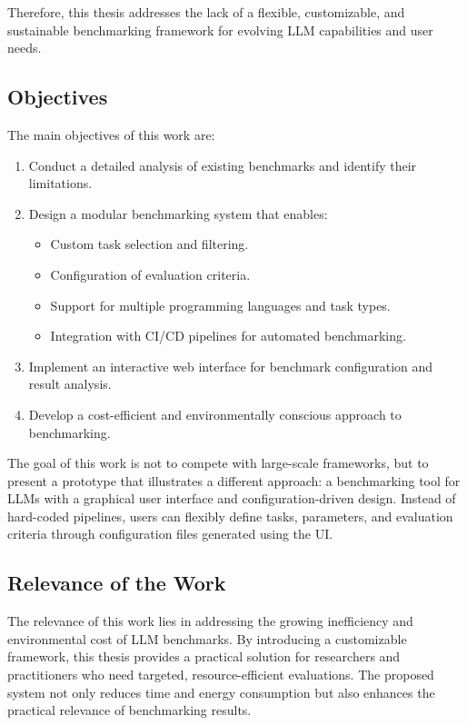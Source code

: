 Therefore, this thesis addresses the lack of a flexible, customizable, and sustainable benchmarking framework for evolving LLM capabilities and user needs.

\subsection{Objectives}

The main objectives of this work are:
\begin{enumerate}
    \item Conduct a detailed analysis of existing benchmarks and identify their limitations.
    \item Design a modular benchmarking system that enables:
    \begin{itemize}
        \item Custom task selection and filtering.
        \item Configuration of evaluation criteria.
        \item Support for multiple programming languages and task types.
        \item Integration with CI/CD pipelines for automated benchmarking.
    \end{itemize}
    \item Implement an interactive web interface for benchmark configuration and result analysis.
    \item Develop a cost-efficient and environmentally conscious approach to benchmarking.
\end{enumerate}

The goal of this work is not to compete with large-scale frameworks, but to present a prototype that illustrates a different approach: a benchmarking tool for LLMs with a graphical user interface and configuration-driven design.
Instead of hard-coded pipelines, users can flexibly define tasks, parameters, and evaluation criteria through configuration files generated using the UI.

\subsection{Relevance of the Work}

The relevance of this work lies in addressing the growing inefficiency and environmental cost of LLM benchmarks.
By introducing a customizable framework, this thesis provides a practical solution for researchers and practitioners who need targeted, resource-efficient evaluations.
The proposed system not only reduces time and energy consumption but also enhances the practical relevance of benchmarking results.

